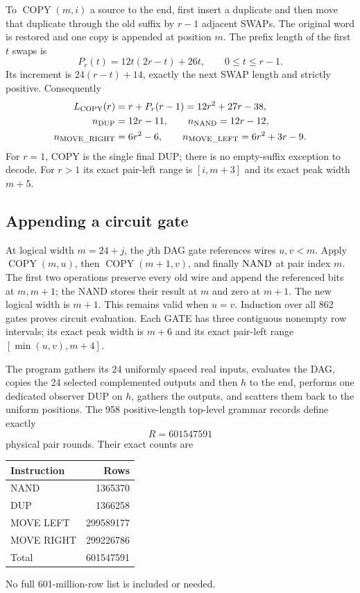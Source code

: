 \documentclass[11pt,letterpaper]{article}
\theoremstyle{definition}\newtheorem{definition}[theorem]{Definition}
\theoremstyle{remark}\newtheorem{remark}[theorem]{Remark}
\newcommand{\DUP}{\operatorname{DUP}}\newcommand{\ML}{\operatorname{MOVE\_LEFT}}
\newcommand{\MR}{\operatorname{MOVE\_RIGHT}}\newcommand{\COPY}{\operatorname{COPY}}
\begin{document}
To $\COPY(m,i)$ a source to the end, first insert a duplicate and then move that duplicate through the old suffix by $r-1$ adjacent SWAPs. The original word is restored and one copy is appended at position $m$. The prefix length of the first $t$ swaps is
\begin{equation}\label{ptr:la:eq:copy-prefix}
 P_r(t)=12t(2r-t)+26t,\qquad 0\le t\le r-1.
\end{equation}
Its increment is $24(r-t)+14$, exactly the next SWAP length and strictly positive. Consequently
\begin{equation}\label{ptr:la:eq:copy-counts}
\begin{split}
 L_{\COPY}(r)&=r+P_r(r-1)=12r^2+27r-38,\\
 n_{\DUP}&=12r-11,\qquad n_{\NAND}=12r-12,\\
 n_{\MR}&=6r^2-6,\qquad n_{\ML}=6r^2+3r-9.
\end{split}
\end{equation}
For $r=1$, COPY is the single final DUP; there is no empty-suffix exception to decode. For $r>1$ its exact pair-left range is $[i,m+3]$ and its exact peak width $m+5$.

\subsection{Appending a circuit gate}
At logical width $m=24+j$, the $j$th DAG gate references wires $u,v<m$. Apply $\COPY(m,u)$, then $\COPY(m+1,v)$, and finally $\operatorname{NAND}$ at pair index $m$. The first two operations preserve every old wire and append the referenced bits at $m,m+1$; the NAND stores their result at $m$ and zero at $m+1$. The new logical width is $m+1$. This remains valid when $u=v$. Induction over all 862 gates proves circuit evaluation. Each GATE has three contiguous nonempty row intervals; its exact peak width is $m+6$ and its exact pair-left range $[\min(u,v),m+4]$.

The program gathers its 24 uniformly spaced real inputs, evaluates the DAG, copies the 24 selected complemented outputs and then $h$ to the end, performs one dedicated observer DUP on $h$, gathers the outputs, and scatters them back to the uniform positions. The 958 positive-length top-level grammar records define exactly
\[
 R=601547591
\]
physical pair rounds. Their exact counts are
\begin{center}
\begin{tabular}{lr}\toprule
Instruction & Rows\\\midrule
NAND & 1365370\\
DUP & 1366258\\
MOVE LEFT & 299589177\\
MOVE RIGHT & 299226786\\\midrule
Total & 601547591\\\bottomrule
\end{tabular}
\end{center}
No full 601-million-row list is included or needed.
\end{document}
